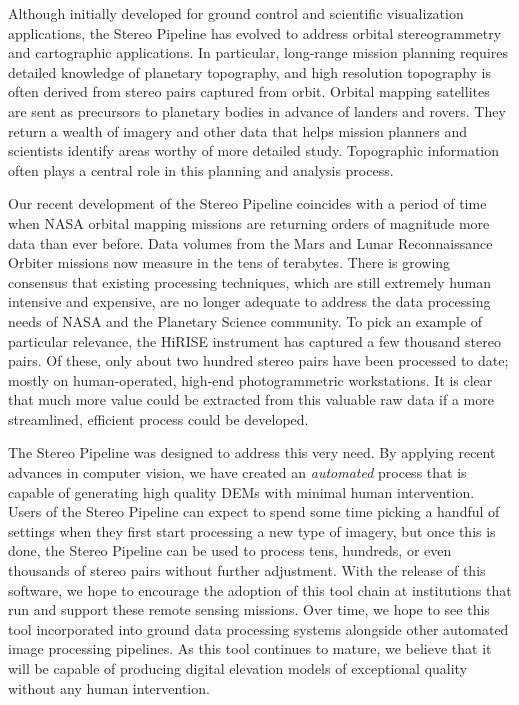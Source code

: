 Although initially developed for ground control and scientific
visualization applications, the Stereo Pipeline has evolved 
 to address orbital stereogrammetry and cartographic
applications.  In particular, long-range mission planning requires
detailed knowledge of planetary topography, and high resolution
topography is often derived from stereo pairs captured from orbit.
Orbital mapping satellites are sent as precursors to planetary bodies
in advance of landers and rovers.  They return a wealth of imagery and
other data that helps mission planners and scientists identify areas
worthy of more detailed study. Topographic information often plays a
central role in this planning and analysis process.

Our recent development of the Stereo Pipeline coincides with a
period of time when \ac{NASA} orbital mapping missions are returning
orders of magnitude more data than ever before.  Data volumes from
the Mars and Lunar Reconnaissance Orbiter missions now measure in
the tens of terabytes.  There is growing consensus that existing
processing techniques, which are still extremely human intensive
and expensive, are no longer adequate to address the data processing
needs of \ac{NASA} and the Planetary Science community.  To pick
an example of particular relevance, the \ac{HiRISE} instrument has
captured a few thousand stereo pairs.
Of these, only about two hundred stereo pairs have been processed to
date; mostly on human-operated, high-end photogrammetric workstations.
It is clear that much more value could be extracted from this
valuable raw data if a more streamlined, efficient process could be
developed.

The Stereo Pipeline was designed to address this very need.  By
applying recent advances in computer vision, we have
created an {\em automated} process that is capable of generating high
quality \acp{DEM} with minimal human intervention.  Users of the Stereo
Pipeline can expect to spend some time picking a handful of settings
when they first start processing a new type of imagery, but once this
is done, the Stereo Pipeline can be used to process tens, hundreds, or
even thousands of stereo pairs without further adjustment.  With the
release of this software, we hope to encourage the adoption of this
tool chain at institutions that run and support these remote sensing
missions.  Over time, we hope to see this tool incorporated into
ground data processing systems alongside other automated image
processing pipelines.  As this tool continues to mature, we believe
that it will be capable of producing digital elevation models of
exceptional quality without any human intervention.

